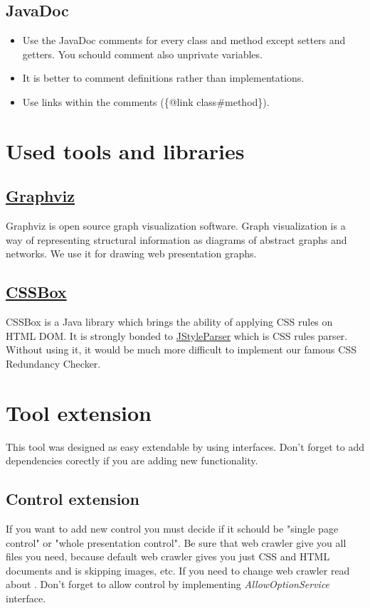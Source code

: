 \documentclass[12pt,a4paper]{article}
\begin{document}
\subsection{JavaDoc}
\begin{itemize}
\item Use the JavaDoc comments for every class and method except setters and getters. You schould comment also unprivate variables.
\item It is better to comment definitions rather than implementations.
\item Use links within the comments (\{@link class\#method\}).
\end{itemize}

\section {Used tools and libraries}
\subsection{\href{http://graphviz.org/}{Graphviz}}
Graphviz is open source graph visualization software. Graph visualization is a way of representing structural information as diagrams of abstract graphs and networks. We use it for drawing web presentation graphs.
\subsection{\href{http://cssbox.sourceforge.net/}{CSSBox}}
CSSBox is a Java library which brings the ability of applying CSS rules on HTML DOM. It is strongly bonded to \href{http://cssbox.sourceforge.net/jstyleparser/}{JStyleParser} which is CSS rules parser. Without using it, it would be much more difficult to implement our famous CSS Redundancy Checker.

\section{Tool extension}
This tool was designed as easy extendable by using interfaces. Don't forget to add dependencies corectly if you are adding new functionality.
\subsection{Control extension}
If you want to add new control you must decide if it schould be "single page control" or "whole presentation control". Be sure that web crawler give you all files you need, because default web crawler gives you just CSS and HTML documents and is skipping  images, etc. If you need to change web crawler read about . Don't forget to allow control by implementing \textit{AllowOptionService} interface.
\end{document}
